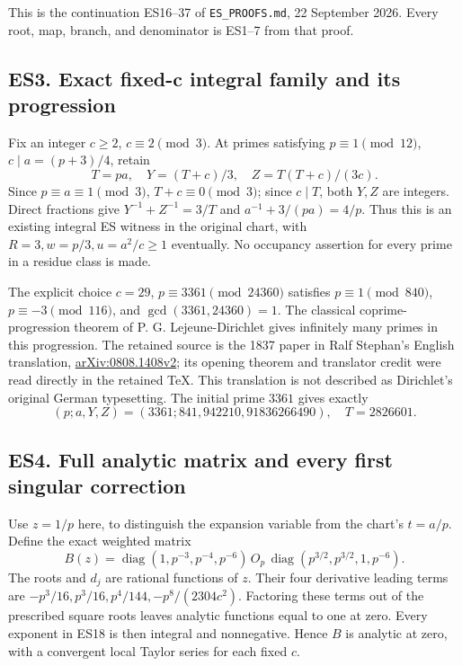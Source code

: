 \documentclass[11pt]{article}
\begin{document}
This is the continuation ES16--37 of \texttt{ES\_PROOFS.md}, 22 September 2026. Every root, map, branch, and denominator is ES1--7 from that proof.

\subsection{ES3. Exact fixed-c integral family and its progression}\label{es3.-exact-fixed-c-integral-family-and-its-progression}

Fix an integer \(c\ge2\), \(c\equiv2\pmod3\). At primes satisfying \(p\equiv1\pmod{12}\), \(c\mid a=(p+3)/4\), retain \[
T=pa,\quad Y=(T+c)/3,\quad Z=T(T+c)/(3c).
\tag{ES16}
\] Since \(p\equiv a\equiv1\pmod3\), \(T+c\equiv0\pmod3\); since \(c\mid T\), both \(Y,Z\) are integers. Direct fractions give \(Y^{-1}+Z^{-1}=3/T\) and \(a^{-1}+3/(pa)=4/p\). Thus this is an existing integral ES witness in the original chart, with \(R=3,w=p/3,u=a^2/c\ge1\) eventually. No occupancy assertion for every prime in a residue class is made.

The explicit choice \(c=29\), \(p\equiv3361\pmod{24360}\) satisfies \(p\equiv1\pmod{840}\), \(p\equiv-3\pmod{116}\), and \(\gcd(3361,24360)=1\). The classical coprime-progression theorem of P. G. Lejeune-Dirichlet gives infinitely many primes in this progression. The retained source is the 1837 paper in Ralf Stephan's English translation, \href{https://arxiv.org/abs/0808.1408v2}{arXiv:0808.1408v2}; its opening theorem and translator credit were read directly in the retained TeX. This translation is not described as Dirichlet's original German typesetting. The initial prime \(3361\) gives exactly \[
(p;a,Y,Z)=(3361;841,942210,91836266490),\quad T=2826601.
\tag{ES17}
\]

\subsection{ES4. Full analytic matrix and every first singular correction}\label{es4.-full-analytic-matrix-and-every-first-singular-correction}

Use \(z=1/p\) here, to distinguish the expansion variable from the chart's \(t=a/p\). Define the exact weighted matrix \[
B(z)=\operatorname{diag}(1,p^{-3},p^{-4},p^{-6})\,O_p\,
\operatorname{diag}(p^{3/2},p^{3/2},1,p^{-6}).
\tag{ES18}
\] The roots and \(d_j\) are rational functions of \(z\). Their four derivative leading terms are \(-p^3/16,p^3/16,p^4/144,-p^8/(2304c^2)\). Factoring these terms out of the prescribed square roots leaves analytic functions equal to one at zero. Every exponent in ES18 is then integral and nonnegative. Hence \(B\) is analytic at zero, with a convergent local Taylor series for each fixed \(c\).
\end{document}
